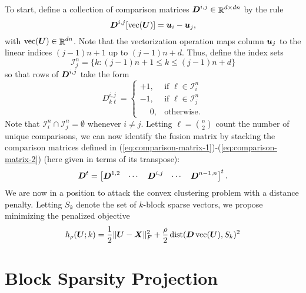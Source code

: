 \documentclass{article}
\begin{document}
To start, define a collection of comparison matrices \(\boldsymbol{D}^{i,j} \in \mathop{\mathbb{R}}\nolimits^{d \times dn}\) by the rule
\begin{equation}
    \label{eq:comparison-matrix-1}
    \boldsymbol{D}^{i,j}[\mathop{\rm vec}\nolimits(\boldsymbol{U})] = \boldsymbol{u}_{i} - \boldsymbol{u}_{j},
\end{equation}
with \(\mathop{\rm vec}\nolimits(\boldsymbol{U}) \in \mathop{\mathbb{R}}\nolimits^{dn}\).
Note that the vectorization operation maps column \(\boldsymbol{u}_{j}\) to the linear indices \((j-1)n + 1\) up to \((j-1)n + d\).
Thus, define the index sets
\begin{equation*}
    \label{eq:index-sets}
    \mathcal{I}_{j}^{n}
    =
    \{k : (j-1)n + 1 \le k \le (j-1)n + d\}
\end{equation*}
so that rows of \(\boldsymbol{D}^{i,j}\) take the form
\begin{equation}
    \label{eq:comparison-matrix-2}
    D_{k\ell}^{i,j}
    =
    \begin{cases}
        +1, & \text{if \(\ell \in \mathcal{I}_{i}^{n}\)} \\
        -1, & \text{if \(\ell \in \mathcal{I}_{j}^{n}\)} \\
        \phantom{+}0, & \text{otherwise}.
    \end{cases}
\end{equation}
Note that \(\mathcal{I}_{i}^{n} \cap \mathcal{I}_{j}^{n} = \emptyset\) whenever \(i \neq j\).
Letting \(\ell = \binom{n}{2}\) count the number of unique comparisons, we can now identify the fusion matrix by stacking the comparison matrices defined in (\ref{eq:comparison-matrix-1})-(\ref{eq:comparison-matrix-2}) (here given in terms of its transpose):
\begin{equation}
    \label{eq:fusion-matrix}
    \boldsymbol{D}^{t}
    =
    \begin{bmatrix}
        \boldsymbol{D}^{1,2}
        & \cdots
        & \boldsymbol{D}^{i,j}
        & \cdots
        & \boldsymbol{D}^{n-1,n}
    \end{bmatrix}^{t}.
\end{equation}
We are now in a position to attack the convex clustering problem with a distance penalty.
Letting \(S_{k}\) denote the set of \(k\)-block sparse vectors, we propose minimizing the penalized objective
\begin{equation}
    h_{\rho}(\boldsymbol{U};k)
    =
    \frac{1}{2}\|\boldsymbol{U} - \boldsymbol{X}\|_{F}^{2}
    +
    \frac{\rho}{2} \mathop{\rm dist}\nolimits(\boldsymbol{D} \mathop{\rm vec}\nolimits(\boldsymbol{U}), S_{k})^{2}
\end{equation}

\section*{\center Block Sparsity Projection}
\end{document}
